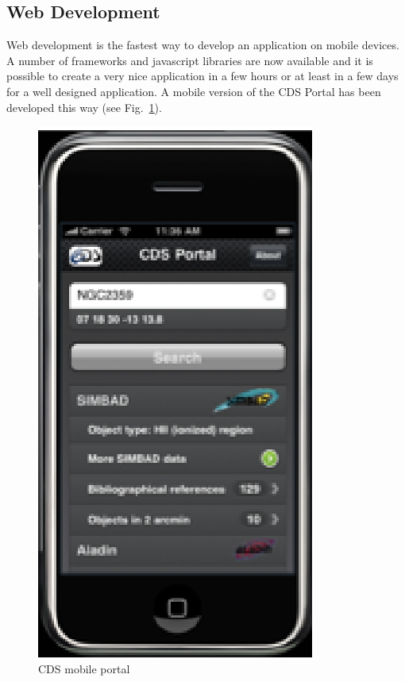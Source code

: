 \subsection{Web Development}
Web development is the fastest way to develop an application on mobile devices. A number of frameworks and javascript libraries are now available and it is possible to create a very nice application in a few hours or at least in a few days for a well designed application. A mobile version of the CDS Portal has been developed this way (see Fig.~\ref{O28:1}).

\begin{figure}[ht] \center
\includegraphics[scale=0.7]{part5/Schaaff_O28/O28_f4.eps}
\caption{CDS mobile portal} 
\label{O28:1}
\end{figure}

